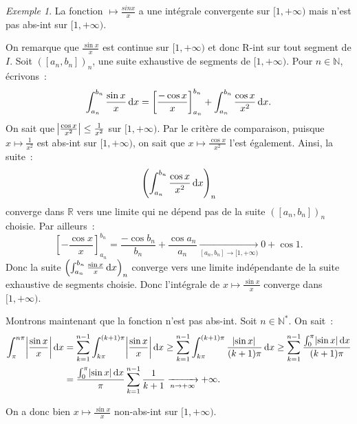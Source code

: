 \documentclass{report}
\theoremstyle{definition}
\theoremstyle{remark}
\newtheorem{ex}{Exemple}[chapter]
\numberwithin{equation}{section}
\newcommand{\R}{\mathbb R}
\newcommand{\N}{\mathbb N}
\newcommand{\Ns}{\N^{*}}
\newcommand{\pinfty}{{+\infty}}
\begin{document}
			\begin{ex} La fonction $\mapsto \frac {sin x}x$ a une intégrale convergente sur $[1, \pinfty)$ mais n'est pas abs-int sur $[1, \pinfty)$.

			On remarque que $\frac {\sin x}x$ est continue sur $[1, \pinfty)$ et donc R-int sur tout segment de $I$. Soit $([a_n, b_n])_n$, une suite exhaustive de
			segments de $[1, \pinfty)$. Pour $n \in \N$, écrivons~:
			\begin{equation}
				\int_{a_n}^{b_n}\frac {\sin x}x\dif x = \left[\frac{-\cos x}x\right]_{a_n}^{b_n} + \int_{a_n}^{b_n}\frac{\cos x}{x^2}\dif x.
			\end{equation}
			On sait que $\abs {\frac{\cos x}{x^2}} \leq \frac 1{x^2}$ sur $[1, \pinfty)$. Par le critère de comparaison, puisque $x \mapsto \frac 1{x^2}$ est abs-int
			sur $[1, \pinfty)$, on sait que $x \mapsto \frac{\cos x}{x^2}$ l'est également. Ainsi, la suite~:
			\begin{equation}
				\left(\int_{a_n}^{b_n}\frac{\cos x}{x^2}\dif x\right)_n
			\end{equation}
			converge dans $\R$ vers une limite qui ne dépend pas de la suite $([a_n, b_n])_n$ choisie. Par ailleurs~:
			\begin{equation}
				\left[-\frac {\cos x}x\right]_{a_n}^{b_n} = \frac{-\cos b_n}{b_n} + \frac{\cos a_n}{a_n} \xrightarrow[{[a_n, b_n] \to [1, \pinfty)}]{} 0 + \cos 1.
			\end{equation}
			Donc la suite $\left(\int_{a_n}^{b_n}\frac{\sin x}x\dif x\right)_n$ converge vers une limite indépendante de la suite exhaustive de segments choisie.
			Donc l'intégrale de $x \mapsto \frac{\sin x}x$ converge dans $[1, \pinfty)$.

			Montrons maintenant que la fonction n'est pas abs-int. Soit $n \in \Ns$. On sait~:
			\begin{align}
				\int_\pi^{n\pi}\abs {\frac{\sin x}x}\dif x &= \sum_{k=1}^{n-1}\int_{k\pi}^{(k+1)\pi}\abs {\frac{\sin x}x}\dif x
				\geq \sum_{k=1}^{n-1}\int_{k\pi}^{(k+1)\pi}\frac {\abs {\sin x}}{(k+1)\pi}\dif x \geq \sum_{k=1}^{n-1}\frac {\int_0^\pi\abs {\sin x}\dif x}{(k+1)\pi} \\
				&= \frac {\int_0^\pi\abs {\sin x}\dif x}{\pi}\sum_{k=1}^{n-1} \frac 1{k+1}\xrightarrow[n \to \pinfty]{} \pinfty.
			\end{align}

			On a donc bien $x \mapsto \frac{\sin x}x$ non-abs-int sur $[1, \pinfty)$.
			\end{ex}
\end{document}
